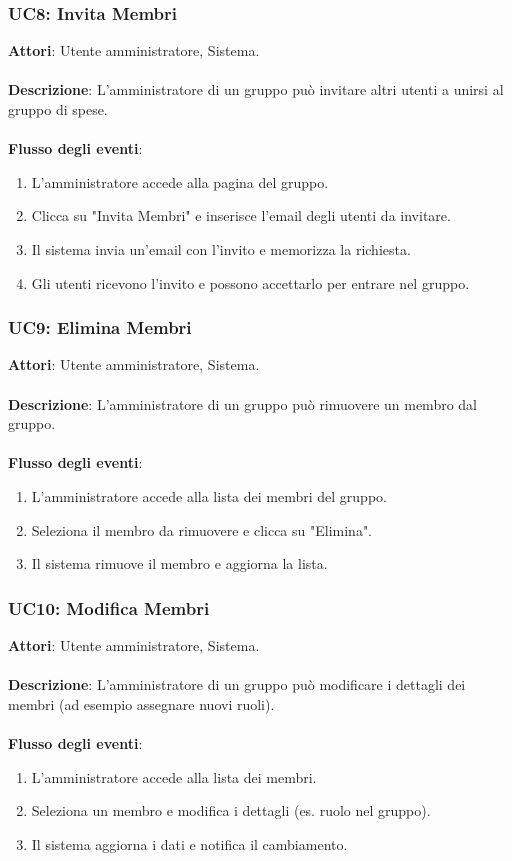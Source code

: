 \subsubsection{UC8: Invita Membri}
\textbf{Attori}: Utente amministratore, Sistema.
\\
\\
\textbf{Descrizione}: L’amministratore di un gruppo può invitare altri utenti a unirsi al gruppo di spese.
\\
\\
\textbf{Flusso degli eventi}:
\begin{enumerate}
    \item L’amministratore accede alla pagina del gruppo.
    \item Clicca su "Invita Membri" e inserisce l’email degli utenti da invitare.
    \item Il sistema invia un’email con l’invito e memorizza la richiesta.
    \item Gli utenti ricevono l’invito e possono accettarlo per entrare nel gruppo.
\end{enumerate}

\subsubsection{UC9: Elimina Membri}
\textbf{Attori}: Utente amministratore, Sistema.
\\
\\
\textbf{Descrizione}: L’amministratore di un gruppo può rimuovere un membro dal gruppo.
\\
\\
\textbf{Flusso degli eventi}:
\begin{enumerate}
    \item L’amministratore accede alla lista dei membri del gruppo.
    \item Seleziona il membro da rimuovere e clicca su "Elimina".
    \item Il sistema rimuove il membro e aggiorna la lista.
\end{enumerate}

\subsubsection{UC10: Modifica Membri}
\textbf{Attori}: Utente amministratore, Sistema.
\\
\\
\textbf{Descrizione}: L’amministratore di un gruppo può modificare i dettagli dei membri (ad esempio assegnare nuovi ruoli).
\\
\\
\textbf{Flusso degli eventi}:
\begin{enumerate}
    \item L’amministratore accede alla lista dei membri.
    \item Seleziona un membro e modifica i dettagli (es. ruolo nel gruppo).
    \item Il sistema aggiorna i dati e notifica il cambiamento.
\end{enumerate}

